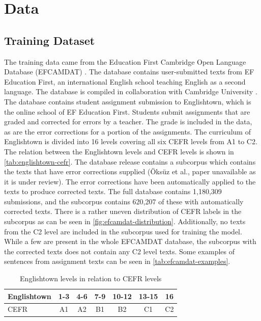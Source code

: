 \documentclass[11pt,a4paper]{article}
\begin{document}
\section{Data}

\subsection{Training Dataset}

The training data came from the Education First Cambridge Open Language
Database (EFCAMDAT) \parencite{inbook}. The database
contains user-submitted texts from EF Education First, an international English
school teaching English as a second language. The database is compiled
in collaboration with Cambridge University \parencite{hgbka17}. The database
contains student assignment submission to Englishtown, which is the online
school of EF Education First. Students submit assignments that are graded and
corrected for errors by a teacher. The grade is included in the data, as are the
error corrections for a portion of the assignments. The curriculum of
Englishtown is divided into 16 levels covering all six CEFR levels from A1
to C2. The relation between the Englishtown levels and CEFR levels is shown in
\autoref{tab:englishtown-cefr}. The database release contains a subcorpus which contains the texts that
have error corrections supplied (Öksüz et al., paper unavailable as it is under
review). The error corrections have been automatically applied to the texts to produce
corrected texts. The full database contains 1,180,309 submissions, and the
subcorpus contains 620,207 of these with automatically corrected texts. There
is a rather uneven distribution of CEFR labels in the subcorpus as can be seen
in \autoref{fig:efcamdat-distribution}. Additionally, no texts from the C2 level
are included in the subcorpus used for training the model. While a few are present in the
whole EFCAMDAT database, the subcorpus with the corrected texts does not contain any C2
level texts. Some examples of sentences from assignment texts can be seen in \autoref{tab:efcamdat-examples}.

\begin{table}
  \centering
  \begin{tabular}{l|cccccc}
    \toprule
    Englishtown & 1-3 & 4-6 & 7-9 & 10-12 & 13-15 & 16 \\
    \midrule
    CEFR & A1 & A2 & B1 & B2 & C1 & C2 \\
    \bottomrule
  \end{tabular}
  \caption{Englishtown levels in relation to CEFR levels}
  \label{tab:englishtown-cefr}
\end{table}
\end{document}
